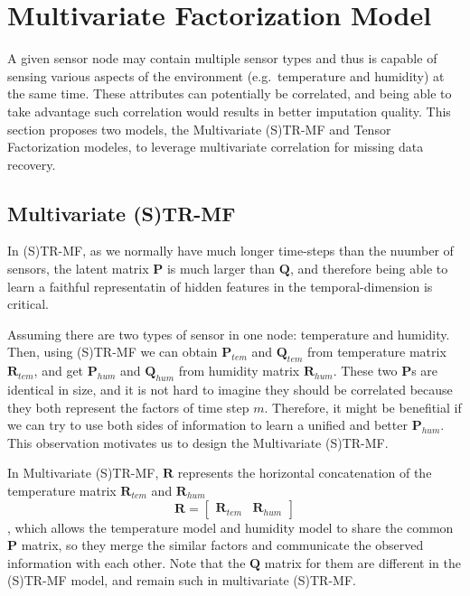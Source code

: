 
\section{Multivariate Factorization Model} \label{sec:tf}
A given sensor node may contain multiple sensor types and thus is capable of sensing various aspects of the environment (e.g.\ temperature and humidity) at the same time.
These attributes can potentially be correlated, and being able to take advantage such correlation would results in better imputation quality.
This section proposes two models, the Multivariate (S)TR-MF and Tensor Factorization modeles, to leverage multivariate correlation for missing data recovery.

\subsection{Multivariate (S)TR-MF} %
In (S)TR-MF, as we normally have much longer time-steps than the nuumber of sensors, the latent matrix $\mathbf{P}$ is much larger than $\mathbf{Q}$, and therefore being able to learn a faithful representatin of hidden features in the temporal-dimension is critical. 

Assuming there are two types of sensor in one node: temperature and humidity. Then, using (S)TR-MF we can obtain $\mathbf{P}_{tem}$ and $\mathbf{Q}_{tem}$ from temperature matrix $\mathbf{R}_{tem}$, and get $\mathbf{P}_{hum}$ and $\mathbf{Q}_{hum}$ from humidity matrix $\mathbf{R}_{hum}$. These two $\mathbf{P}$s are identical in size, and it is not hard to imagine they should be correlated because they both represent the factors of time step $m$. Therefore, it might be benefitial if we can try to use both sides of information to learn a unified and better $\mathbf{P}_{hum}$.
This observation motivates us to design the Multivariate (S)TR-MF.

In Multivariate (S)TR-MF, $\mathbf{R}$ represents the horizontal concatenation of the temperature matrix $\mathbf{R}_{tem}$ and $\mathbf{R}_{hum}$
\begin{equation*} \mathbf{R} = \begin{bmatrix}\mathbf{R}_{tem} & \mathbf{R}_{hum} \end{bmatrix} \end{equation*}
, which allows the temperature model and humidity model to share the common $\mathbf{P}$ matrix, so they merge the similar factors and communicate the observed information with each other. Note that the $\mathbf{Q}$ matrix for them are different in the (S)TR-MF model, and remain such in multivariate (S)TR-MF.

